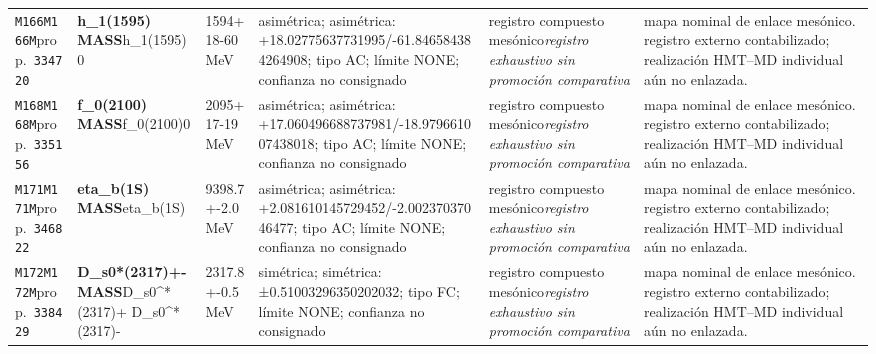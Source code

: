 \begin{landscape}
\begin{longtable}{L{1.85cm}L{4.45cm}L{2.35cm}L{4.05cm}L{3.35cm}L{7.15cm}}
\texttt{M166}\newline \texttt{M166M}\newline prop.\ \texttt{334720} & \textbf{h\_\allowbreak{}1(1595) MASS}\newline h\_\allowbreak{}1(1595)0 & 1594+18-60\,MeV & asimétrica; asimétrica: +18.02775637731995/-61.846584384264908; tipo AC; límite NONE; confianza no consignado & registro compuesto mesónico\newline \emph{registro exhaustivo sin promoción comparativa} & mapa nominal de enlace mesónico. registro externo contabilizado; realización HMT--MD individual aún no enlazada. \\
\texttt{M168}\newline \texttt{M168M}\newline prop.\ \texttt{335156} & \textbf{f\_\allowbreak{}0(2100) MASS}\newline f\_\allowbreak{}0(2100)0 & 2095+17-19\,MeV & asimétrica; asimétrica: +17.060496688737981/-18.979661007438018; tipo AC; límite NONE; confianza no consignado & registro compuesto mesónico\newline \emph{registro exhaustivo sin promoción comparativa} & mapa nominal de enlace mesónico. registro externo contabilizado; realización HMT--MD individual aún no enlazada. \\
\texttt{M171}\newline \texttt{M171M}\newline prop.\ \texttt{346822} & \textbf{eta\_\allowbreak{}b(1S) MASS}\newline eta\_\allowbreak{}b(1S) & 9398.7+-2.0\,MeV & asimétrica; asimétrica: +2.081610145729452/-2.00237037046477; tipo AC; límite NONE; confianza no consignado & registro compuesto mesónico\newline \emph{registro exhaustivo sin promoción comparativa} & mapa nominal de enlace mesónico. registro externo contabilizado; realización HMT--MD individual aún no enlazada. \\
\texttt{M172}\newline \texttt{M172M}\newline prop.\ \texttt{338429} & \textbf{D\_\allowbreak{}s0*(2317)+- MASS}\newline D\_\allowbreak{}s0\textasciicircum{}*(2317)+ \textbar{}\allowbreak{} D\_\allowbreak{}s0\textasciicircum{}*(2317)- & 2317.8+-0.5\,MeV & simétrica; simétrica: ±0.51003296350202032; tipo FC; límite NONE; confianza no consignado & registro compuesto mesónico\newline \emph{registro exhaustivo sin promoción comparativa} & mapa nominal de enlace mesónico. registro externo contabilizado; realización HMT--MD individual aún no enlazada. \\

\end{longtable}
\end{landscape}
